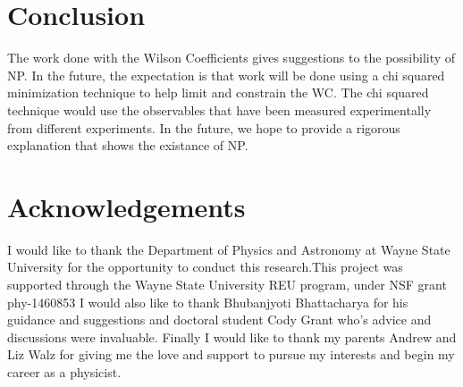 \documentclass[12pt]{article}
\begin{document}
\section{Conclusion}
The work done with the Wilson Coefficients gives suggestions to the possibility of NP. In the future, the expectation is that work will be done using a chi squared minimization technique to help limit and constrain the WC. The chi squared technique would use the observables that have been measured experimentally from different experiments. In the future, we hope to provide a rigorous explanation that shows the existance of NP.  
\section{Acknowledgements}
I would like to thank the Department of Physics and Astronomy at Wayne State University for the opportunity to conduct this research.This project was supported through the Wayne State University REU program, under NSF grant phy-1460853 I would also like to thank Bhubanjyoti Bhattacharya for his guidance and suggestions and doctoral student Cody Grant who's advice and discussions were invaluable. Finally I would like to thank my parents Andrew and Liz Walz for giving me the love and support to pursue my interests and begin my career as a physicist.  
\newpage
\end{document}
